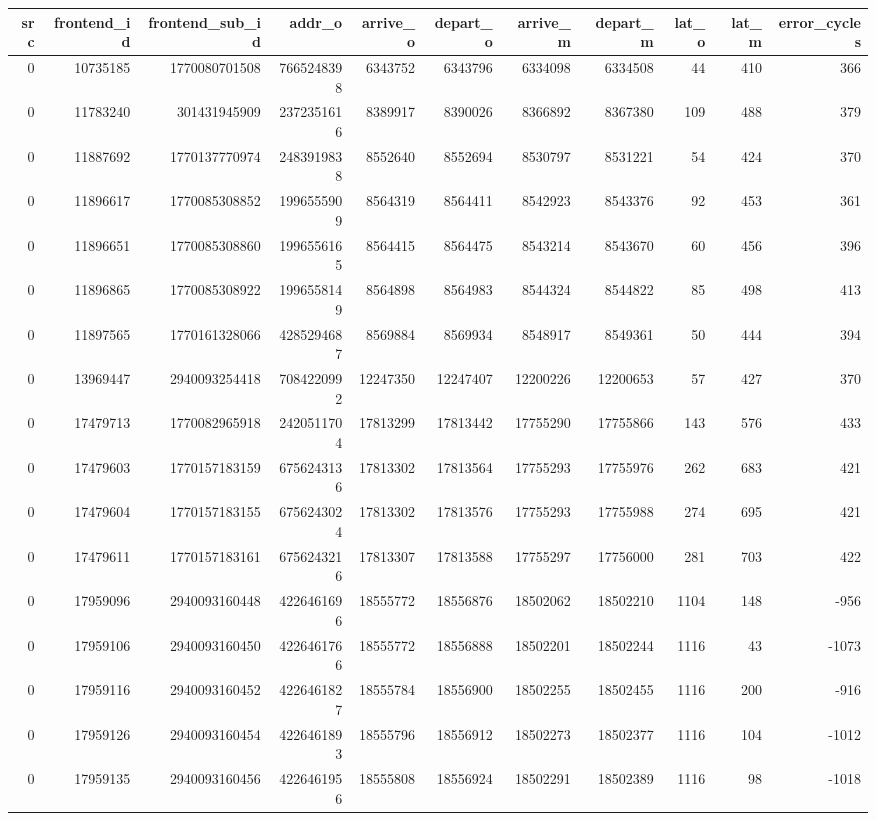 \begin{tabular}{rrrrrrrrrrr}
\toprule
src & frontend\_id & frontend\_sub\_id & addr\_o & arrive\_o & depart\_o & arrive\_m & depart\_m & lat\_o & lat\_m & error\_cycles \\
\midrule
0 & 10735185 & 1770080701508 & 7665248398 & 6343752 & 6343796 & 6334098 & 6334508 & 44 & 410 & 366 \\
0 & 11783240 & 301431945909 & 2372351616 & 8389917 & 8390026 & 8366892 & 8367380 & 109 & 488 & 379 \\
0 & 11887692 & 1770137770974 & 2483919838 & 8552640 & 8552694 & 8530797 & 8531221 & 54 & 424 & 370 \\
0 & 11896617 & 1770085308852 & 1996555909 & 8564319 & 8564411 & 8542923 & 8543376 & 92 & 453 & 361 \\
0 & 11896651 & 1770085308860 & 1996556165 & 8564415 & 8564475 & 8543214 & 8543670 & 60 & 456 & 396 \\
0 & 11896865 & 1770085308922 & 1996558149 & 8564898 & 8564983 & 8544324 & 8544822 & 85 & 498 & 413 \\
0 & 11897565 & 1770161328066 & 4285294687 & 8569884 & 8569934 & 8548917 & 8549361 & 50 & 444 & 394 \\
0 & 13969447 & 2940093254418 & 7084220992 & 12247350 & 12247407 & 12200226 & 12200653 & 57 & 427 & 370 \\
0 & 17479713 & 1770082965918 & 2420511704 & 17813299 & 17813442 & 17755290 & 17755866 & 143 & 576 & 433 \\
0 & 17479603 & 1770157183159 & 6756243136 & 17813302 & 17813564 & 17755293 & 17755976 & 262 & 683 & 421 \\
0 & 17479604 & 1770157183155 & 6756243024 & 17813302 & 17813576 & 17755293 & 17755988 & 274 & 695 & 421 \\
0 & 17479611 & 1770157183161 & 6756243216 & 17813307 & 17813588 & 17755297 & 17756000 & 281 & 703 & 422 \\
0 & 17959096 & 2940093160448 & 4226461696 & 18555772 & 18556876 & 18502062 & 18502210 & 1104 & 148 & -956 \\
0 & 17959106 & 2940093160450 & 4226461766 & 18555772 & 18556888 & 18502201 & 18502244 & 1116 & 43 & -1073 \\
0 & 17959116 & 2940093160452 & 4226461827 & 18555784 & 18556900 & 18502255 & 18502455 & 1116 & 200 & -916 \\
0 & 17959126 & 2940093160454 & 4226461893 & 18555796 & 18556912 & 18502273 & 18502377 & 1116 & 104 & -1012 \\
0 & 17959135 & 2940093160456 & 4226461956 & 18555808 & 18556924 & 18502291 & 18502389 & 1116 & 98 & -1018 \\

\end{tabular}
